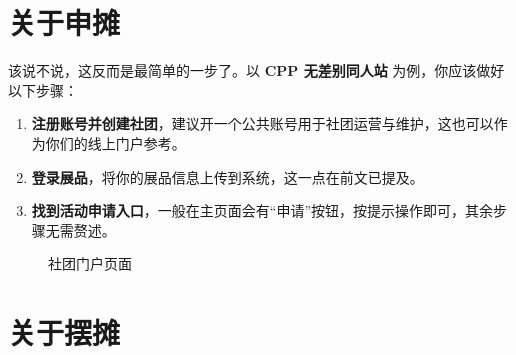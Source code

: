 \section{关于申摊}\label{ux5173ux4e8eux7533ux644a}

该说不说，这反而是最简单的一步了。以 \textbf{CPP 无差别同人站}
为例，你应该做好以下步骤：

\begin{enumerate}
\def\labelenumi{\arabic{enumi}.}
\item
  \textbf{注册账号并创建社团}，建议开一个公共账号用于社团运营与维护，这也可以作为你们的线上门户参考。
\item
  \textbf{登录展品}，将你的展品信息上传到系统，这一点在前文已提及。
\item
  \textbf{找到活动申请入口}，一般在主页面会有``申请''按钮，按提示操作即可，其余步骤无需赘述。
\end{enumerate}

\begin{figure}[H]
\centering
{}
\caption{社团门户页面}
\end{figure}

\section{关于摆摊}\label{ux5173ux4e8eux6446ux644a}

